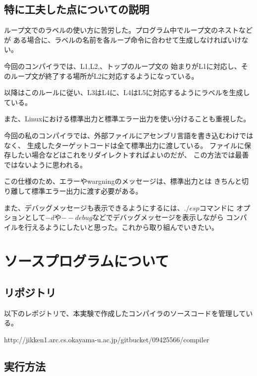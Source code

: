 \documentclass[11pt,a4j]{jarticle}
\begin{document}
\subsection{特に工夫した点についての説明}

ループ文でのラベルの使い方に苦労した。プログラム中でループ文のネストなどが
ある場合に、ラベルの名前を各ループ命令に合わせて生成しなければいけない。

今回のコンパイラでは、L1,L2,、トップのループ文の
始まりがL1に対応し、そのループ文が終了する場所がL2に対応するようになっている。

以降はこのルールに従い、L3はL4に、L4はL5に対応するようにラベルを生成している。

\vspace{0.2in}

また、Linuxにおける標準出力と標準エラー出力を使い分けることも重視した。

今回の私のコンパイラでは、外部ファイルにアセンブリ言語を書き込むわけではなく、
生成したターゲットコードは全て標準出力に渡している。
ファイルに保存したい場合などはこれをリダイレクトすればよいのだが、
この方法では最善ではないように思われる。

この仕様のため、エラーやwargningのメッセージは、標準出力とは
きちんと切り離して標準エラー出力に渡す必要がある。

また、デバッグメッセージも表示できるようにするには、$./esp$コマンドに
オプションとして$-d$や$--debug$などでデバッグメッセージを表示しながら
コンパイルを行えるようにしたいと思った。これから取り組んでいきたい。



\section{ソースプログラムについて}

\subsection{リポジトリ}

以下のレポジトリで、本実験で作成したコンパイラのソースコードを管理している。

http://jikken1.arc.cs.okayama-u.ac.jp/gitbucket/09425566/compiler


\subsection{実行方法}
\end{document}
